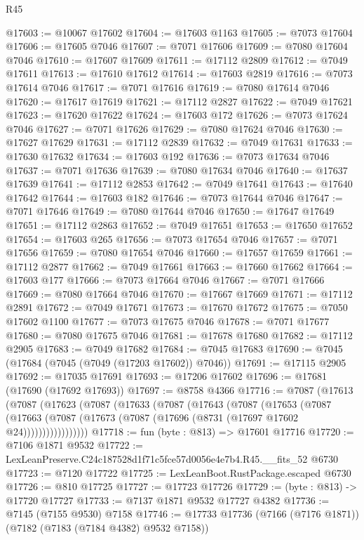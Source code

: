 \begin{lexlean}{R45}
\begin{coremodule}
{@17603 := @10067 @17602
@17604 := @17603 @1163
@17605 := @7073 @17604
@17606 := @17605 @7046
@17607 := @7071 @17606
@17609 := @7080 @17604 @7046
@17610 := @17607 @17609
@17611 := @17112 @2809
@17612 := @7049 @17611
@17613 := @17610 @17612
@17614 := @17603 @2819
@17616 := @7073 @17614 @7046
@17617 := @7071 @17616
@17619 := @7080 @17614 @7046
@17620 := @17617 @17619
@17621 := @17112 @2827
@17622 := @7049 @17621
@17623 := @17620 @17622
@17624 := @17603 @172
@17626 := @7073 @17624 @7046
@17627 := @7071 @17626
@17629 := @7080 @17624 @7046
@17630 := @17627 @17629
@17631 := @17112 @2839
@17632 := @7049 @17631
@17633 := @17630 @17632
@17634 := @17603 @192
@17636 := @7073 @17634 @7046
@17637 := @7071 @17636
@17639 := @7080 @17634 @7046
@17640 := @17637 @17639
@17641 := @17112 @2853
@17642 := @7049 @17641
@17643 := @17640 @17642
@17644 := @17603 @182
@17646 := @7073 @17644 @7046
@17647 := @7071 @17646
@17649 := @7080 @17644 @7046
@17650 := @17647 @17649
@17651 := @17112 @2863
@17652 := @7049 @17651
@17653 := @17650 @17652
@17654 := @17603 @265
@17656 := @7073 @17654 @7046
@17657 := @7071 @17656
@17659 := @7080 @17654 @7046
@17660 := @17657 @17659
@17661 := @17112 @2877
@17662 := @7049 @17661
@17663 := @17660 @17662
@17664 := @17603 @177
@17666 := @7073 @17664 @7046
@17667 := @7071 @17666
@17669 := @7080 @17664 @7046
@17670 := @17667 @17669
@17671 := @17112 @2891
@17672 := @7049 @17671
@17673 := @17670 @17672
@17675 := @7050 @17602 @1100
@17677 := @7073 @17675 @7046
@17678 := @7071 @17677
@17680 := @7080 @17675 @7046
@17681 := @17678 @17680
@17682 := @17112 @2905
@17683 := @7049 @17682
@17684 := @7045 @17683
@17690 := @7045 (@17684 (@7045 (@7049 (@17203 @17602)) @7046))
@17691 := @17115 @2905
@17692 := @17035 @17691
@17693 := @17206 @17602
@17696 := @17681 (@17690 (@17692 @17693))
@17697 := @8758 @4366
@17716 := @7087
    (@17613
      (@7087
        (@17623
          (@7087
            (@17633
              (@7087
                (@17643
                  (@7087
                    (@17653
                      (@7087
                        (@17663
                          (@7087 (@17673 (@7087 (@17696 (@8731 (@17697 @17602 @24)))))))))))))))))
@17718 := fun (byte : @813) => @17601 @17716
@17720 := @7106 @1871 @9532
@17722 := LexLeanPreserve.C24c187528d1f71c5fce57d0056e4e7b4.R45.__fits_52 @6730
@17723 := @7120 @17722
@17725 := LexLeanBoot.RustPackage.escaped @6730
@17726 := @810 @17725
@17727 := @17723 @17726
@17729 := (byte : @813) -> @17720 @17727
@17733 := @7137 @1871 @9532 @17727 @4382
@17736 := @7145 (@7155 @9530) @7158
@17746 := @17733 @17736 (@7166 (@7176 @1871)) (@7182 (@7183 (@7184 @4382) @9532 @7158))
}
\end{coremodule}
\end{lexlean}
